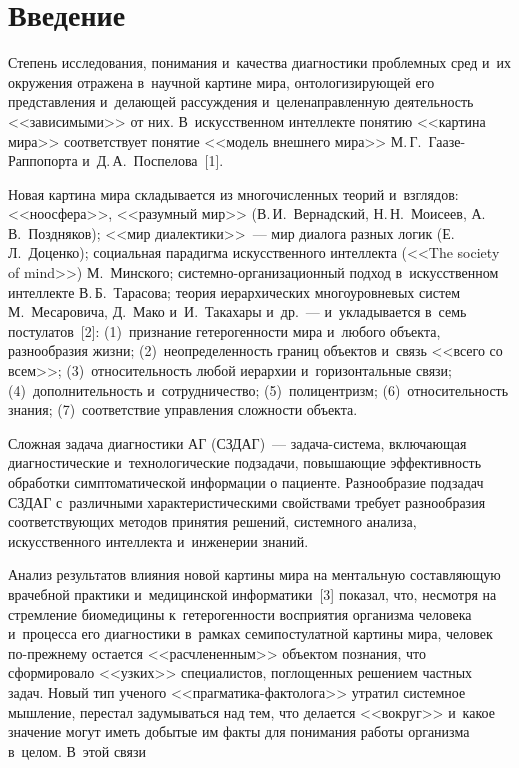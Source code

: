 



\thispagestyle{headings}

\begin{multicols}{2}

\label{st\stat}
  

\section{Введение}

  Степень исследования, понимания и~качества диагностики проблемных сред и~их 
окружения отражена в~научной картине мира, онтологи\-зи\-ру\-ющей его представления 
и~делающей рассуждения и~целенаправленную деятельность <<зависимыми>> от них. 
В~искусственном интеллекте понятию <<картина мира>> соответствует понятие <<модель 
внешнего мира>> М.\,Г.~Га\-азе-Рап\-по\-пор\-та и~Д.\,А.~Поспелова~[1]. 
  
  Новая картина мира складывается из многочисленных теорий и~взглядов: <<ноосфера>>, 
<<разумный мир>> (В.\,И.~Вернадский, Н.\,Н.~Моисеев, А.\,В.~Поздняков); <<мир 
диалектики>>~--- мир диалога разных логик (Е.\,Л.~Доценко); социальная парадигма 
искусственного интеллекта (<<The society of mind>>) М.~Минского;  
сис\-тем\-но-ор\-га\-ни\-за\-ци\-он\-ный подход в~искусственном интеллекте 
В.\,Б.~Тарасова; теория иерархических многоуровневых систем М.~Месаровича, Д.~Мако 
и~И.~Такахары и~др.~--- и~укладывается в~семь постулатов~[2]: (1)~признание 
гетерогенности мира и~любого объекта, разнообразия жизни; (2)~неопределенность границ 
объектов и~связь <<всего со всем>>; (3)~относительность любой иерархии и~горизонтальные 
связи; (4)~дополнительность и~сотрудничество; (5)~полицентризм; (6)~относительность 
знания; (7)~соответствие управления сложности объекта. 
  
  Сложная задача диагностики АГ (СЗДАГ)~---
  за\-да\-ча-сис\-те\-ма, вклю\-ча\-ющая диагностические и~технологические подзадачи, 
повышающие эффективность обработки симптоматической информации о пациенте. 
Разнообразие подзадач СЗДАГ с~различными характеристическими свойствами требует 
разнообразия соответствующих методов принятия решений, системного анализа, 
искусственного интеллекта и~инженерии знаний. 
  
  Анализ результатов влияния новой картины мира на ментальную составляющую 
врачебной практики и~медицинской информатики~[3] показал, что, несмотря на стремление 
биомедицины к~гетерогенности восприятия организма человека и~процесса его диагностики 
в~рамках семипостулатной картины мира, человек по-преж\-не\-му остается 
<<расчлененным>> объектом познания, что сформировало <<узких>> специалистов, 
поглощенных решением частных задач. Новый тип ученого <<праг\-ма\-ти\-ка-фак\-то\-ло\-га>> 
утратил системное мышление, перестал задумываться над тем, что делается <<вокруг>> 
и~какое значение могут иметь добытые им факты для понимания работы организма в~целом. 
В~этой связи\linebreak\vspace*{-12pt}


\end{multicols}
